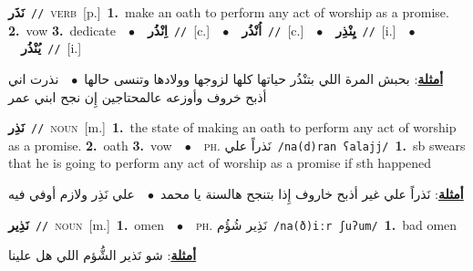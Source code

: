 \documentclass[10pt,a4paper,twoside]{article} %
\begin{document}
\begin{multicols}{2}
{\setlength\topsep{0pt}\textbf{\foreignlanguage{arabic}{نَذَر}}\ {\color{gray}\texttt{//}\color{black}}\ \textsc{verb}\ [p.]\ \textbf{1.}~make an oath to perform any act of worship as a promise.  \textbf{2.}~vow  \textbf{3.}~dedicate\ \ $\bullet$\ \ \setlength\topsep{0pt}\textbf{\foreignlanguage{arabic}{اِنْذُر}}\ {\color{gray}\texttt{//}\color{black}}\ [c.]\ \ $\bullet$\ \ \setlength\topsep{0pt}\textbf{\foreignlanguage{arabic}{اُنْذُر}}\ {\color{gray}\texttt{//}\color{black}}\ [c.]\ \ $\bullet$\ \ \setlength\topsep{0pt}\textbf{\foreignlanguage{arabic}{يِنْذِر}}\ {\color{gray}\texttt{//}\color{black}}\ [i.]\ \ $\bullet$\ \ \setlength\topsep{0pt}\textbf{\foreignlanguage{arabic}{يُنْذُر}}\ {\color{gray}\texttt{//}\color{black}}\ [i.]\  \begin{flushright}\color{gray}\foreignlanguage{arabic}{\textbf{\underline{\foreignlanguage{arabic}{أمثلة}}}: بحبش المرة اللي بتنْذُر حياتها كلها لزوجها وولادها وتنسى حالها\ $\bullet$\ \  نذرت اني أذبح خروف وأوزعه عالمحتاجين إِن نجح ابني عمر}\end{flushright}\color{black}} \vspace{2mm}

{\setlength\topsep{0pt}\textbf{\foreignlanguage{arabic}{نَذِر}}\ {\color{gray}\texttt{//}\color{black}}\ \textsc{noun}\ [m.]\ \textbf{1.}~the state of making an oath to perform any act of worship as a promise.  \textbf{2.}~oath  \textbf{3.}~vow\ \ $\bullet$\ \ \textsc{ph.} \color{gray} \foreignlanguage{arabic}{نَذراً علي}\color{black}\ {\color{gray}\texttt{/{\sffamily na(d)ran ʕalajj}/}\color{black}}\ \textbf{1.}~sb swears that he is going to  perform any act of worship as a promise if sth happened\  \begin{flushright}\color{gray}\foreignlanguage{arabic}{\textbf{\underline{\foreignlanguage{arabic}{أمثلة}}}: نَذراً علي غير أذبح خاروف إِذا بتنجح هالسنة يا محمد\ $\bullet$\ \  علي نَذِر ولازم أوفي فيه}\end{flushright}\color{black}} \vspace{2mm}

{\setlength\topsep{0pt}\textbf{\foreignlanguage{arabic}{نَذِير}}\ {\color{gray}\texttt{//}\color{black}}\ \textsc{noun}\ [m.]\ \textbf{1.}~omen\ \ $\bullet$\ \ \textsc{ph.} \color{gray} \foreignlanguage{arabic}{نَذِير شُؤُم}\color{black}\ {\color{gray}\texttt{/{\sffamily na(ð)iːr ʃuʔum}/}\color{black}}\ \textbf{1.}~bad omen\  \begin{flushright}\color{gray}\foreignlanguage{arabic}{\textbf{\underline{\foreignlanguage{arabic}{أمثلة}}}: شو نَذير الشُّؤم اللي هل علينا}\end{flushright}\color{black}} \vspace{2mm}


\end{multicols}
\end{document}
